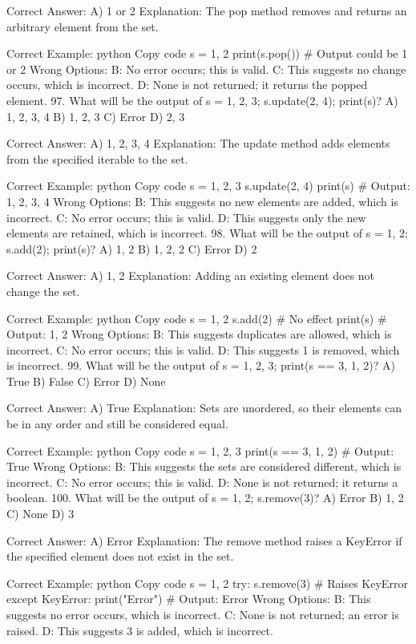 Correct Answer: A) 1 or 2
Explanation: The pop method removes and returns an arbitrary element from the set.

Correct Example:
python
Copy code
s = {1, 2}
print(s.pop())  # Output could be 1 or 2
Wrong Options:
B: No error occurs; this is valid.
C: This suggests no change occurs, which is incorrect.
D: None is not returned; it returns the popped element.
97. What will be the output of s = {1, 2, 3}; s.update({2, 4}); print(s)?
A) {1, 2, 3, 4}
B) {1, 2, 3}
C) Error
D) {2, 3}

Correct Answer: A) {1, 2, 3, 4}
Explanation: The update method adds elements from the specified iterable to the set.

Correct Example:
python
Copy code
s = {1, 2, 3}
s.update({2, 4})
print(s)  # Output: {1, 2, 3, 4}
Wrong Options:
B: This suggests no new elements are added, which is incorrect.
C: No error occurs; this is valid.
D: This suggests only the new elements are retained, which is incorrect.
98. What will be the output of s = {1, 2}; s.add(2); print(s)?
A) {1, 2}
B) {1, 2, 2}
C) Error
D) {2}

Correct Answer: A) {1, 2}
Explanation: Adding an existing element does not change the set.

Correct Example:
python
Copy code
s = {1, 2}
s.add(2)  # No effect
print(s)  # Output: {1, 2}
Wrong Options:
B: This suggests duplicates are allowed, which is incorrect.
C: No error occurs; this is valid.
D: This suggests 1 is removed, which is incorrect.
99. What will be the output of s = {1, 2, 3}; print(s == {3, 1, 2})?
A) True
B) False
C) Error
D) None

Correct Answer: A) True
Explanation: Sets are unordered, so their elements can be in any order and still be considered equal.

Correct Example:
python
Copy code
s = {1, 2, 3}
print(s == {3, 1, 2})  # Output: True
Wrong Options:
B: This suggests the sets are considered different, which is incorrect.
C: No error occurs; this is valid.
D: None is not returned; it returns a boolean.
100. What will be the output of s = {1, 2}; s.remove(3)?
A) Error
B) {1, 2}
C) None
D) {3}

Correct Answer: A) Error
Explanation: The remove method raises a KeyError if the specified element does not exist in the set.

Correct Example:
python
Copy code
s = {1, 2}
try:
    s.remove(3)  # Raises KeyError
except KeyError:
    print("Error")  # Output: Error
Wrong Options:
B: This suggests no error occurs, which is incorrect.
C: None is not returned; an error is raised.
D: This suggests 3 is added, which is incorrect.

